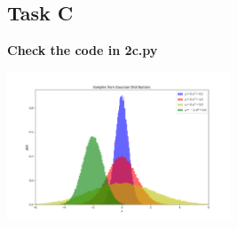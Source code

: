 \documentclass[12pt]{article}
\begin{document}
\subsection{Task C}
\textbf{Check the code in 2c.py}
\begin{minipage}{\linewidth}
    \begin{center}
        \includegraphics[width=0.5\textwidth]{images/2c.png}
    \end{center}
\end{minipage}
\end{document}
